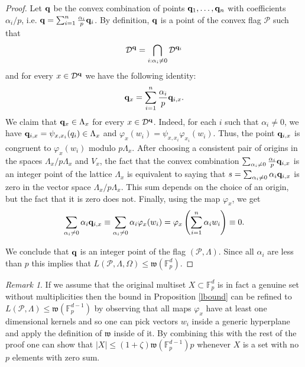 \documentclass{daj}
\renewcommand{\le}{\leqslant}
\newcommand{\w}{\mathfrak w}
\newcommand{\FF}{\mathbb F}
\newcommand{\D}{\mathcal D}
\renewcommand{\P}{\mathcal P}
\theoremstyle{definition}
\theoremstyle{remark}
\newtheorem*{remark}{Remark}
\theoremstyle{definition}
\theoremstyle{definition}
\begin{document}
\begin{proof}
Let ${\bf q}$ be the convex combination of points ${\bf q}_1, \ldots, {\bf q}_n$ with coefficients $\alpha_i/p$, i.e. ${\bf q} = \sum_{i=1}^n \frac{\alpha_i}{p} {\bf q}_i$. By definition, ${\bf q}$ is a point of the convex flag $\P$ such that 
$$
\D^{\bf q} = \bigcap_{i:\alpha_i \neq 0} \D^{{\bf q}_i}
$$
and for every $x \in \D^{\bf q}$ we have the following identity:
\begin{equation}\label{comb2}
{\bf q}_x = \sum_{i =1}^n \frac{\alpha_i}{p} {\bf q}_{i, x}.
\end{equation}
We claim that ${\bf q}_x \in \Lambda_x$ for every $x \in \D^{\bf q}$. Indeed, for each $i$ such that $\alpha_i\neq 0$, we have ${\bf q}_{i, x} = \psi_{x, x_i}(q_i) \in \Lambda_{x}$ and $\varphi_x(w_i) = \psi_{x, x_i} \varphi_{x_i}(w_i)$. Thus, the point ${\bf q}_{i, x}$ is congruent to $\varphi_x(w_i)$ modulo $p\Lambda_{x}$. After choosing a consistent pair of origins in the spaces $\Lambda_x/p\Lambda_x$ and $V_{x}$, the fact that the convex combination $\sum_{\alpha_i \neq 0} \frac{\alpha_i}{p} {\bf q}_{i, x}$ is an integer point of the lattice $\Lambda_x$ is equivalent to saying that $s = \sum_{\alpha_i \neq 0} \alpha_i {\bf q}_{i, x}$ is zero in the vector space $\Lambda_x/p\Lambda_x$. This sum depends on the choice of an origin, but the fact that it is zero does not. Finally, using the map $\varphi_x$, we get
\begin{equation}\label{zero}
    \sum_{\alpha_i \neq 0} \alpha_i {\bf q}_{i, x} \equiv \sum_{\alpha_i \neq 0} \alpha_i \varphi_x(w_i) = \varphi_x \left( \sum_{i = 1}^n \alpha_i w_i \right) \equiv 0.
\end{equation}
 
We conclude that ${\bf q}$ is an integer point of the flag $(\P, \Lambda)$. Since all $\alpha_i$ are less than $p$ this implies that $L(\P, \Lambda, \Omega) \le \w(\FF_p^d)$.
\end{proof}

\begin{remark}
If we assume that the original multiset $X \subset \FF_p^d$ is in fact a genuine set without multiplicities then the bound in Proposition \ref{lbound} can be refined to $L(\P, \Lambda) \le \w(\FF_p^{d-1})$ by observing that all maps $\varphi_x$ have at least one dimensional kernels and so one can pick vectors $w_i$ inside a generic hyperplane and apply the definition of $\w$ inside of it. By combining this with the rest of the proof one can show that $|X| \le (1+\zeta) \w(\FF^{d-1}_p) p$ whenever $X$ is a set with no $p$ elements with zero sum.
\end{remark}
\vskip 0.5cm
\end{document}
